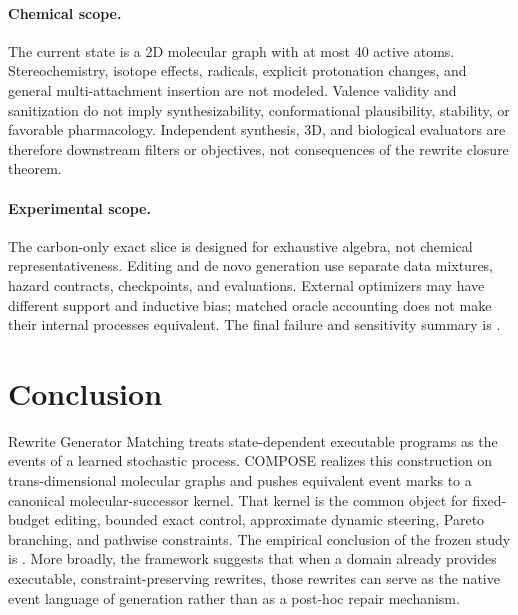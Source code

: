 \paragraph{Chemical scope.}
The current state is a 2D molecular graph with at most 40 active atoms.
Stereochemistry, isotope effects, radicals, explicit protonation changes, and
general multi-attachment insertion are not modeled. Valence validity and
sanitization do not imply synthesizability, conformational plausibility,
stability, or favorable pharmacology. Independent synthesis, 3D, and biological
evaluators are therefore downstream filters or objectives, not consequences of
the rewrite closure theorem.

\paragraph{Experimental scope.}
The carbon-only exact slice is designed for exhaustive algebra, not chemical
representativeness. Editing and de novo generation use separate data mixtures,
hazard contracts, checkpoints, and evaluations. External optimizers may have
different support and inductive bias; matched oracle accounting does not make
their internal processes equivalent. The final failure and sensitivity summary
is .

\section{Conclusion}
\label{sec:conclusion}

Rewrite Generator Matching treats state-dependent executable programs as the
events of a learned stochastic process. COMPOSE realizes this construction on
trans-dimensional molecular graphs and pushes equivalent event marks to a
canonical molecular-successor kernel. That kernel is the common object for
fixed-budget editing, bounded exact control, approximate dynamic steering,
Pareto branching, and pathwise constraints. The empirical conclusion of the
frozen study is . More broadly, the
framework suggests that when a domain already provides executable,
constraint-preserving rewrites, those rewrites can serve as the native event
language of generation rather than as a post-hoc repair mechanism.
